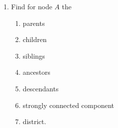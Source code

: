 \begin{enumerate}
\begin{enumerate}
  \begin{enumerate}
    \item List all bidirected paths of length 3.
    \item Give two examples of bidirected walks of length 3.
    \item List all collider paths of length 5.
    \item Give two examples of a collider walk of length 5.
    \item Given an example of a trek of length 4.
  \end{enumerate}
  \item Find for node $A$ the
  \begin{enumerate}
    \item parents
    \item children
    \item siblings
    \item ancestors
    \item descendants
    \item strongly connected component
    \item district.
  \end{enumerate}
\end{enumerate}


\end{enumerate}
